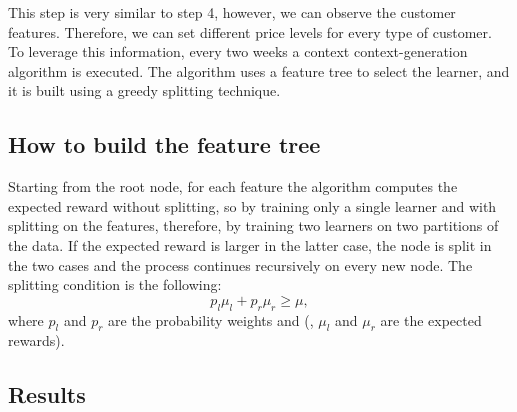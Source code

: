 This step is very similar to step 4, however, we can observe the customer features.
Therefore, we can set different price levels for every type of customer.
To leverage this information, every two weeks a context context-generation algorithm is executed.
The algorithm uses a feature tree to select the learner, and it is built using a greedy splitting technique.

\subsection{How to build the feature tree}
Starting from the root node, for each feature the algorithm computes the expected reward without splitting, so by training only a single learner and with splitting on the features, therefore, by training two learners on two partitions of the data.
If the expected reward is larger in the latter case, the node is split in the two cases and the process continues recursively on every new node.
The splitting condition is the following:
\begin{equation}
    p_l\mu_l + p_r \mu_r \geq \mu,
\end{equation}
where \(p_l\) and \(p_r\) are the probability weights and (\mu\), \(\mu_l\) and \(\mu_r\) are the expected rewards).

\subsection{Results}
